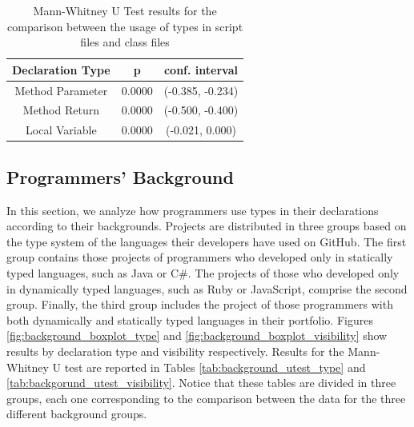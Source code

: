 \documentclass[preprint]{sigplanconf}
\begin{document}
\begin{table}[ht]
\centering{}%
\begin{tabular}{|c|c|c|}
\hline 
Declaration Type & p & conf. interval \\
\hline 
\hline 
Method Parameter              & 0.0000	& (-0.385, -0.234) \\ \hline
Method Return                 & 0.0000	& (-0.500, -0.400) \\ \hline
Local Variable                & 0.0000	& (-0.021, 0.000)  \\ \hline
\hline 
\end{tabular}
\label{tab:script_utest_all}
\caption{Mann-Whitney U Test results for the comparison between the usage of types in script files and class files}
\end{table}

\subsection{Programmers' Background\label{res-background}}
In this section, we analyze how programmers use types in their declarations according to their backgrounds.
Projects are distributed in three groups based on the type system of the languages their developers have used on GitHub.
The first group contains those projects of programmers who developed only in statically typed languages, such as Java or C\#.
The projects of those who developed only in dynamically typed languages, such as Ruby or JavaScript, comprise the second group.
Finally, the third group includes the project of those programmers with both dynamically and statically typed languages in their portfolio.
Figures \ref{fig:background_boxplot_type} and \ref{fig:background_boxplot_visibility}  show results by declaration type and visibility respectively.
Results for the Mann-Whitney U test are reported in Tables \ref{tab:background_utest_type} and \ref{tab:backgorund_utest_visibility}.
Notice that these tables are divided in three groups, each one corresponding to the comparison between the data for the three different background groups.
\end{document}
